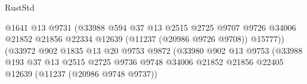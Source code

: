 \begin{lexlean}{RustStd}
\begin{coremodule}
                                                    @1641
                                                    @13
                                                    @9731
                                                    (@33988
                                                      @594
                                                      @37
                                                      @13
                                                      @2515
                                                      @2725
                                                      @9707
                                                      @9726
                                                      @34006
                                                      @21852
                                                      @21856
                                                      @22334
                                                      @12639
                                                      (@11237 (@20986 @9726 @9708))
                                                      @15777))
                                                  (@33972
                                                    @902
                                                    @1835
                                                    @13
                                                    @20
                                                    @9753
                                                    @9872
                                                    (@33980
                                                      @902
                                                      @13
                                                      @9753
                                                      (@33988
                                                        @193
                                                        @37
                                                        @13
                                                        @2515
                                                        @2725
                                                        @9736
                                                        @9748
                                                        @34006
                                                        @21852
                                                        @21856
                                                        @22405
                                                        @12639
                                                        (@11237 (@20986 @9748 @9737))

\end{coremodule}
\end{lexlean}
